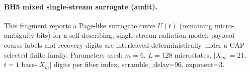 \paragraph{BH5 mixed single-stream surrogate (audit).} \AuditTag This fragment reports a Page-like surrogate curve $U(t)$ (remaining micro-ambiguity bits) for a self-describing, single-stream radiation model: payload coarse labels and recovery digits are interleaved deterministically under a CAP-selected finite family. Parameters used: $m=6$, $L=128$ microstates, $|X_m|=21$, $t=1$ base-$|X_m|$ digits per fiber index, scramble\_delay=96, exponent=3.